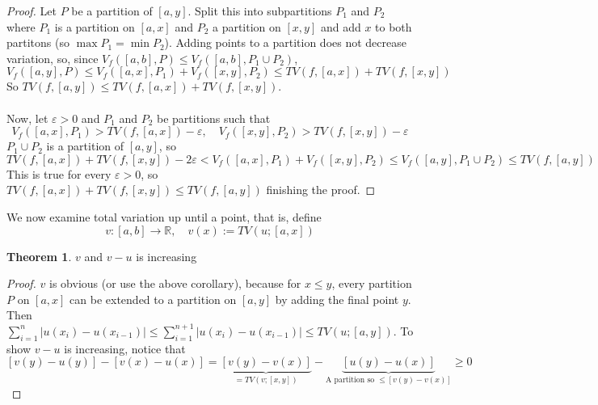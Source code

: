 \documentclass[11pt,a4paper]{article}
\theoremstyle{definition}
\newtheorem{theorem}{Theorem}[section]
\begin{document}
\begin{proof}
Let $P$ be a partition of $[a,y]$. Split this into subpartitions $P_1$ and $P_2$ where $P_1$ is a partition on $[a,x]$ and $P_2$ a partition on $[x,y]$ and add $x$ to both partitons (so $\max P_1 = \min P_2$). Adding points to a partition does not decrease variation, so, since $V_f([a,b], P) \le V_f ([a,b], P_1 \cup P_2)$, \[
V_f ([a,y], P) \le V_f([a,x], P_1) + V_f([x,y], P_2) \le TV(f, [a,x]) + TV(f, [x,y])
\]
So $TV(f, [a,y]) \le TV(f, [a,x]) + TV(f, [x,y])$. ~\\~\\Now, let $\varepsilon > 0$ and $P_1$ and $P_2$ be partitions such that \[
V_f([a,x], P_1) > TV(f, [a,x]) - \varepsilon, \quad V_f([x,y], P_2) > TV(f, [x,y]) - \varepsilon
\]
$P_1 \cup P_2$ is a partition of $[a,y]$, so \[
TV(f, [a,x]) + TV(f, [x,y]) - 2 \varepsilon < V_f ([a,x], P_1) + V_f ([x,y], P_2) \le V_f([a,y], P_1 \cup P_2) \le TV(f, [a,y])
\]
This is true for every $\varepsilon > 0$, so $TV(f, [a,x]) + TV(f, [x,y]) \le TV(f, [a,y])$ finishing the proof.
\end{proof}

\noindent
We now examine total variation up until a point, that is, define \[v : [a,b] \to \mathbb{R}, \quad v(x) := TV(u; [a,x])\]

\begin{theorem}
    $v$ and $v-u$ is increasing
\end{theorem}

\begin{proof}
    $v$ is obvious (or use the above corollary), because for $x \le y$, every partition $P$ on $[a,x]$ can be extended to a partition on $[a,y]$ by adding the final point $y$. Then $\sum \limits _{i=1}^n |u(x_{i}) - u(x_{i-1})| \le \sum \limits _{i=1}^{n+1} |u(x_{i}) - u(x_{i-1})| \le TV(u; [a,y])$. To show $v-u$ is increasing, notice that 
    \[
    [v(y) - u(y)] - [v(x) - u(x)] = \underbrace{[v(y) - v(x)]}_{= TV(v; [x,y])} - \underbrace{[u(y) - u(x)]}_{\text{A partition so } \le [v(y)-v(x)]} \ge 0
    \]
\end{proof}
\end{document}
